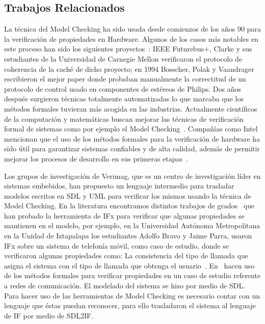 \subsection{Trabajos Relacionados}

La t\'ecnica del Model Checking ha sido usada desde comienzos de los a\~nos 90 
para la verificaci\'on de propiedades en Hardware. Algunos de los casos m\'as 
notables en este proceso han sido los siguientes proyectos~\cite{Clarke1996,
Woodcock2009}: IEEE Futurebus+, Clarke y sus estudiantes de la Universidad de 
Carnegie Mellon verificaron  el protocolo de coherencia de la cach\'e de dicho 
proyecto; en 1994 Bosscher, Polak y Vaandrager escribieron el mejor paper donde 
probaban manualmente la correctitud de un protocolo de control usado en 
componentes de est\'ereos de Philips. Dos a\~nos despu\'es surgieron t\'ecnicas 
totalmente automatizadas lo que marcaba que los m\'etodos formales tuvieran 
m\'as acogida en las industrias. Actualmente cient\'ificos de la computaci\'on y 
matem\'aticas buscan mejorar las t\'ecnicas de verificaci\'on formal de sistemas 
como por ejemplo el Model Checking~\cite{Gaudel1996}. Compa\~n\'ias como Intel 
mencionan que el uso de los m\'etodos formales para la verificaci\'on de 
hardware ha sido \'util para garantizar sistemas confiables y de alta calidad, 
adem\'as de permitir mejorar los procesos de desarrollo en sus primeras 
etapas~\cite{Fix2008}.

Los grupos de investigaci\'on de Verimag, que es un centro de investigaci\'on 
l\'ider en sistemas embebidos, han propuesto un lenguaje intermedio para 
trasladar modelos escritos en SDL y UML para verificar los mismos usando la 
t\'ecnica de Model Checking. En la literatura encontramos distintos trabajos de 
grados~\cite{BravoParra2006, Hames2009, Perez2006} que han probado la 
herramienta de IFx para verificar que algunas propiedades se mantienen en el 
modelo, por ejemplo, en la Universidad Aut\'onoma Metropolitana en la Unidad de 
Iztapalapa los estudiantes Adolfo Bravo y Jaime Parra, usaron IFx sobre un 
sistema de telefon\'ia m\'ovil, como caso de estudio, donde se verificaron 
algunas propiedades como: La consistencia del tipo de llamada que asigna el 
sistema con el tipo de llamada que obtenga el usuario~\cite{BravoParra2006}. 
En~\cite{Vaovic2005} hacen uso de los m\'etodos formales para 
verificar propiedades en un caso de estudio referente a redes de comunicaci\'on. 
El modelado del sistema se hizo por medio de SDL. Para hacer uso de las 
herramientas de Model Checking es necesario contar con un lenguaje que \'estas 
puedan reconocer, para ello trasladaron el sistema al lenguaje de IF por medio 
de SDL2IF. 

